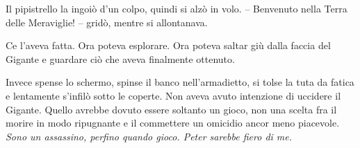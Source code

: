 {Il pipistrello la ingoiò d'un colpo, quindi si alzò in volo. --
	Benvenuto nella Terra delle Meraviglie! -- gridò, mentre si
	allontanava.}

{Ce l'aveva fatta. Ora poteva esplorare. Ora poteva saltar giù dalla
	faccia del Gigante e guardare ciò che aveva finalmente ottenuto.}

{Invece spense lo schermo, spinse il banco nell'armadietto, si tolse la
	tuta da fatica e lentamente s'infilò sotto le coperte. Non aveva avuto
	intenzione di uccidere il Gigante. Quello avrebbe dovuto essere soltanto
	un gioco, non una scelta fra il morire in modo ripugnante e il
	commettere un omicidio ancor meno piacevole. \emph{Sono un assassino,
		perfino quando gioco. Peter sarebbe fiero di me.}}

\label{Orsonux20Scottux20Cardux20-ux20Ilux20Giocoux20Diux20Enderux20-ux20BY_SLY70A1_split_009.htm}{}

